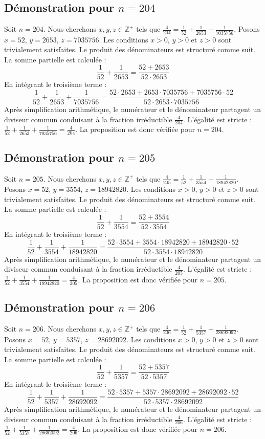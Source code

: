 \documentclass[11pt,a4paper]{article}
\begin{document}
\subsection{Démonstration pour $n = 204$}
Soit $n = 204$. Nous cherchons $x, y, z \in \mathbb{Z}^{+}$ tels que $\frac{4}{204} = \frac{1}{52} + \frac{1}{2653} + \frac{1}{7035756}$.
Posons $x = 52$, $y = 2653$, $z = 7035756$.
Les conditions $x > 0$, $y > 0$ et $z > 0$ sont trivialement satisfaites.
Le produit des dénominateurs est structuré comme suit. La somme partielle est calculée :
$$ \frac{1}{52} + \frac{1}{2653} = \frac{52+2653}{52 \cdot 2653} $$
En intégrant le troisième terme :
$$ \frac{1}{52} + \frac{1}{2653} + \frac{1}{7035756} = \frac{52 \cdot 2653 + 2653 \cdot 7035756 + 7035756 \cdot 52}{52 \cdot 2653 \cdot 7035756} $$
Après simplification arithmétique, le numérateur et le dénominateur partagent un diviseur commun conduisant à la fraction irréductible $\frac{4}{204}$.
L'égalité est stricte : $\frac{1}{52} + \frac{1}{2653} + \frac{1}{7035756} = \frac{4}{204}$.
La proposition est donc vérifiée pour $n = 204$.
\subsection{Démonstration pour $n = 205$}
Soit $n = 205$. Nous cherchons $x, y, z \in \mathbb{Z}^{+}$ tels que $\frac{4}{205} = \frac{1}{52} + \frac{1}{3554} + \frac{1}{18942820}$.
Posons $x = 52$, $y = 3554$, $z = 18942820$.
Les conditions $x > 0$, $y > 0$ et $z > 0$ sont trivialement satisfaites.
Le produit des dénominateurs est structuré comme suit. La somme partielle est calculée :
$$ \frac{1}{52} + \frac{1}{3554} = \frac{52+3554}{52 \cdot 3554} $$
En intégrant le troisième terme :
$$ \frac{1}{52} + \frac{1}{3554} + \frac{1}{18942820} = \frac{52 \cdot 3554 + 3554 \cdot 18942820 + 18942820 \cdot 52}{52 \cdot 3554 \cdot 18942820} $$
Après simplification arithmétique, le numérateur et le dénominateur partagent un diviseur commun conduisant à la fraction irréductible $\frac{4}{205}$.
L'égalité est stricte : $\frac{1}{52} + \frac{1}{3554} + \frac{1}{18942820} = \frac{4}{205}$.
La proposition est donc vérifiée pour $n = 205$.
\subsection{Démonstration pour $n = 206$}
Soit $n = 206$. Nous cherchons $x, y, z \in \mathbb{Z}^{+}$ tels que $\frac{4}{206} = \frac{1}{52} + \frac{1}{5357} + \frac{1}{28692092}$.
Posons $x = 52$, $y = 5357$, $z = 28692092$.
Les conditions $x > 0$, $y > 0$ et $z > 0$ sont trivialement satisfaites.
Le produit des dénominateurs est structuré comme suit. La somme partielle est calculée :
$$ \frac{1}{52} + \frac{1}{5357} = \frac{52+5357}{52 \cdot 5357} $$
En intégrant le troisième terme :
$$ \frac{1}{52} + \frac{1}{5357} + \frac{1}{28692092} = \frac{52 \cdot 5357 + 5357 \cdot 28692092 + 28692092 \cdot 52}{52 \cdot 5357 \cdot 28692092} $$
Après simplification arithmétique, le numérateur et le dénominateur partagent un diviseur commun conduisant à la fraction irréductible $\frac{4}{206}$.
L'égalité est stricte : $\frac{1}{52} + \frac{1}{5357} + \frac{1}{28692092} = \frac{4}{206}$.
La proposition est donc vérifiée pour $n = 206$.
\end{document}
